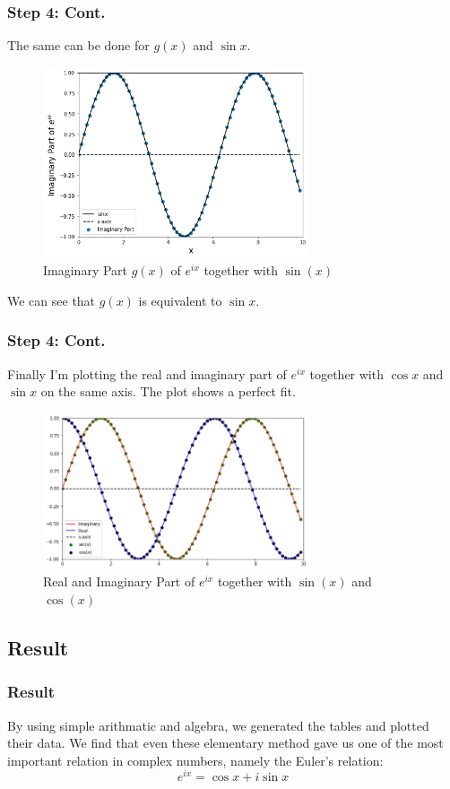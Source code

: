 \documentclass{beamer}
\begin{document}
\begin{frame}
    \frametitle{Step 4: Cont.}
    The same can be done for $g(x)$ and $\sin{x}$.
        \begin{figure}
        \centering
        \includegraphics[width=0.7\textwidth, height=0.55\textheight]{img/imaginary.png}
        \caption{\label{fig:imag}Imaginary Part $g(x)$ of $e^{ix}$ together with $\sin(x)$}
    \end{figure}
    \pause
    We can see that $g(x)$ is equivalent to $\sin{x}$.
\end{frame}
\begin{frame}
    \frametitle{Step 4: Cont.}
    Finally I'm plotting the real and imaginary part of $e^{ix}$ together with $\cos{x}$ and $\sin{x}$ on the same axis. The plot shows a perfect fit.
    \begin{figure}
        \centering
        \includegraphics[width=0.7\textwidth]{img/all.png}
        \caption{\label{fig:all}Real and Imaginary Part of $e^{ix}$ together with $\sin(x)$ and $\cos(x)$}
    \end{figure}
\end{frame}

\subsection{Result}
\begin{frame}
    \frametitle{Result}
    By using simple arithmatic and algebra, we generated the tables and plotted their data. We find that even these elementary method gave us one of the most important relation in complex numbers, namely the Euler's relation:
    \begin{equation*}
            e^{ix} = \cos{x} + i\sin{x}
    \end{equation*}
\end{frame}
\end{document}
